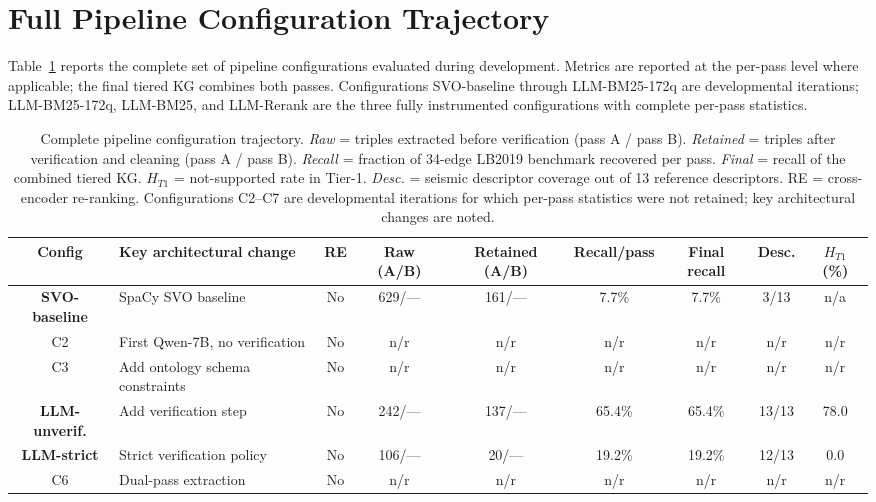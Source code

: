 \documentclass[10pt]{article}
\begin{document}
\section{Full Pipeline Configuration Trajectory}
\label{app:full-trajectory}

Table~\ref{tab:full-trajectory} reports the complete
set of pipeline configurations evaluated during
development.
Metrics are reported at the per-pass level where
applicable; the final tiered KG combines both passes.
Configurations SVO-baseline through LLM-BM25-172q are developmental iterations;
LLM-BM25-172q, LLM-BM25, and LLM-Rerank are the three fully instrumented
configurations with complete per-pass statistics.

\begin{table}[htb]
\centering
\caption{Complete pipeline configuration trajectory.
  \emph{Raw} = triples extracted before verification
  (pass A / pass B).
  \emph{Retained} = triples after verification and
  cleaning (pass A / pass B).
  \emph{Recall} = fraction of 34-edge LB2019
  benchmark recovered per pass.
  \emph{Final} = recall of the combined tiered KG.
  $H_{T1}$ = not-supported rate in Tier-1.
  \emph{Desc.} = seismic descriptor coverage
  out of 13 reference descriptors.
  RE = cross-encoder re-ranking.
  Configurations C2--C7 are developmental iterations
  for which per-pass statistics were not retained;
  key architectural changes are noted.}
\label{tab:full-trajectory}
\footnotesize
\setlength{\tabcolsep}{4pt}
\begin{tabular}{clccccccc}
\toprule
\textbf{Config} &
\textbf{Key architectural change} &
\textbf{RE} &
\textbf{Raw (A/B)} &
\textbf{Retained (A/B)} &
\textbf{Recall/pass} &
\textbf{Final recall} &
\textbf{Desc.} &
$H_{T1}$ (\%) \\
\midrule
\textbf{SVO-baseline}
  & SpaCy SVO baseline
  & No & 629/--- & 161/--- & 7.7\% & 7.7\% & 3/13 & n/a \\
C2
  & First Qwen-7B, no verification
  & No & n/r & n/r & n/r & n/r & n/r & n/r \\
C3
  & Add ontology schema constraints
  & No & n/r & n/r & n/r & n/r & n/r & n/r \\
\textbf{LLM-unverif.}
  & Add verification step
  & No & 242/--- & 137/--- & 65.4\% & 65.4\% & 13/13 & 78.0 \\
\textbf{LLM-strict}
  & Strict verification policy
  & No & 106/--- & 20/--- & 19.2\% & 19.2\% & 12/13 & 0.0 \\
C6
  & Dual-pass extraction
  & No & n/r & n/r & n/r & n/r & n/r & n/r \\

\end{tabular}
\end{table}
\end{document}
